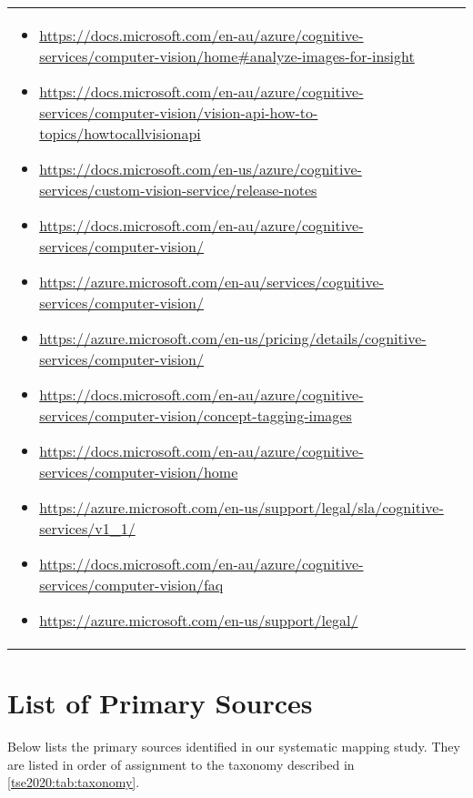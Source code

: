 {\begin{longtable}{p{.2\linewidth}|p{.725\linewidth}}
\begin{itemize}[label=,leftmargin=10pt,topsep=0pt,partopsep=0pt,noitemsep,nolistsep,itemindent=-10pt]
\item \url{https://docs.microsoft.com/en-au/azure/cognitive-services/computer-vision/home#analyze-images-for-insight}
\item \url{https://docs.microsoft.com/en-au/azure/cognitive-services/computer-vision/vision-api-how-to-topics/howtocallvisionapi}
\item \url{https://docs.microsoft.com/en-us/azure/cognitive-services/custom-vision-service/release-notes}
\item \url{https://docs.microsoft.com/en-au/azure/cognitive-services/computer-vision/}
\item \url{https://azure.microsoft.com/en-au/services/cognitive-services/computer-vision/}
\item \url{https://azure.microsoft.com/en-us/pricing/details/cognitive-services/computer-vision/}
\item \url{https://docs.microsoft.com/en-au/azure/cognitive-services/computer-vision/concept-tagging-images}
\item \url{https://docs.microsoft.com/en-au/azure/cognitive-services/computer-vision/home}
\item \url{https://azure.microsoft.com/en-us/support/legal/sla/cognitive-services/v1_1/}
\item \url{https://docs.microsoft.com/en-au/azure/cognitive-services/computer-vision/faq}
\item \url{https://azure.microsoft.com/en-us/support/legal/}
    \end{itemize}\\
\end{longtable}}


\clearpage
\section{List of Primary Sources}\label{tse2020:sec:primary-sources}

Below lists the primary sources identified in our systematic mapping study. They are listed in order of assignment to the taxonomy described in \cref{tse2020:tab:taxonomy}.

\bigskip

